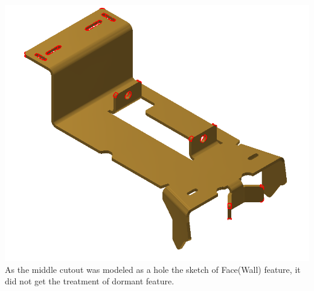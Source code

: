 \begin{minipage}{\linewidth}
\begin{minipage}[c]{0.62\linewidth}
\includegraphics[width=\linewidth,valign=t]{images/CommercialBracket_PhI_model}
 \label{fig:results:CommercialBracket_PhImodel}
As the middle cutout was modeled as a hole the sketch of Face(Wall) feature, it did not get the treatment of dormant feature. 
\end{minipage}
\quad
\begin{minipage}[c]{0.3\linewidth}

\end{minipage}
\end{minipage}
